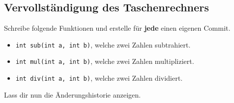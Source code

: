 \subsection{Vervollständigung des Taschenrechners}
Schreibe folgende Funktionen und erstelle für \textbf{jede} einen eigenen Commit.
\begin{itemize}
	\item \lstinline{int sub(int a, int b)}, welche zwei Zahlen subtrahiert.
	\item \lstinline{int mul(int a, int b)}, welche zwei Zahlen multipliziert.
	\item \lstinline{int div(int a, int b)}, welche zwei Zahlen dividiert.
\end{itemize}
Lass dir nun die Änderungshistorie anzeigen.
